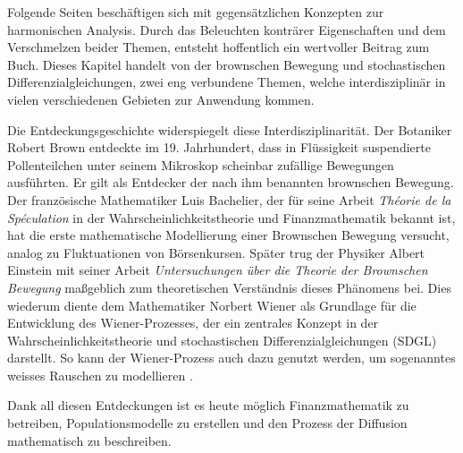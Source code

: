%
%
%
%

Folgende Seiten beschäftigen sich mit gegensätzlichen Konzepten zur harmonischen Analysis. Durch das Beleuchten konträrer Eigenschaften und dem Verschmelzen beider Themen, entsteht hoffentlich ein wertvoller Beitrag zum Buch. Dieses Kapitel handelt von der brownschen Bewegung und stochastischen Differenzialgleichungen, zwei eng verbundene Themen, welche interdisziplinär in vielen verschiedenen Gebieten zur Anwendung kommen.

Die Entdeckungsgeschichte widerspiegelt diese Interdisziplinarität. Der Botaniker Robert Brown entdeckte im 19. Jahrhundert, dass in Flüssigkeit suspendierte Pollenteilchen unter seinem Mikroskop scheinbar zufällige Bewegungen ausführten. Er gilt als Entdecker der nach ihm benannten brownschen Bewegung. Der französische Mathematiker Luis Bachelier, der für seine Arbeit \textit{Théorie de la Spéculation} in der Wahrscheinlichkeitstheorie und Finanzmathematik bekannt ist, hat die erste mathematische Modellierung einer Brownschen Bewegung versucht, analog zu Fluktuationen von Börsenkursen. Später trug der Physiker Albert Einstein mit seiner Arbeit \textit{Untersuchungen über die Theorie der Brownschen Bewegung} maßgeblich zum theoretischen Verständnis dieses Phänomens bei. Dies wiederum diente dem Mathematiker Norbert Wiener als Grundlage für die Entwicklung des Wiener-Prozesses, der ein zentrales Konzept in der Wahrscheinlichkeitstheorie und stochastischen Differenzialgleichungen (SDGL) darstellt. So kann der Wiener-Prozess auch dazu genutzt werden, um sogenanntes weisses Rauschen zu modellieren .

Dank all diesen Entdeckungen ist es heute möglich Finanzmathematik zu betreiben, Populationsmodelle zu erstellen und den Prozess der Diffusion mathematisch zu beschreiben. %